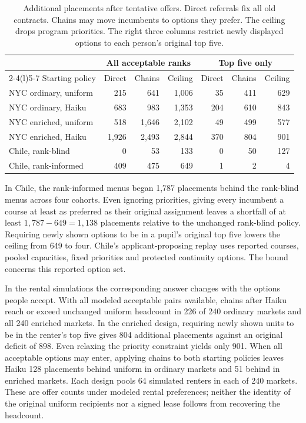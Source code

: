 \begin{table}[ht]\centering\small
\caption{Additional placements after tentative offers. Direct referrals fix all old contracts. Chains may move incumbents to options they prefer. The ceiling drops program priorities. The right three columns restrict newly displayed options to each person's original top five.}\label{tab:chain-flow}
\begin{tabular}{@{}l rrr rrr@{}}\toprule
 & \multicolumn{3}{c}{All acceptable ranks} & \multicolumn{3}{c}{Top five only}\\
\cmidrule(lr){2-4}\cmidrule(l){5-7}
Starting policy & Direct & Chains & Ceiling & Direct & Chains & Ceiling\\\midrule
NYC ordinary, uniform &215 &641 &1,006 &35 &411 &629\\
NYC ordinary, Haiku &683 &983 &1,353 &204 &610 &843\\
NYC enriched, uniform &518 &1,646 &2,102 &49 &499 &577\\
NYC enriched, Haiku &1,926 &2,493 &2,844 &370 &804 &901\\
Chile, rank-blind &0 &53 &133 &0 &50 &127\\
Chile, rank-informed &409 &475 &649 &1 &2 &4\\\bottomrule
\end{tabular}
\end{table}

In Chile, the rank-informed menus began 1,787 placements behind the rank-blind menus across four cohorts. Even ignoring priorities, giving every incumbent a course at least as preferred as their original assignment leaves a shortfall of at least $1,787-649=1,138$ placements relative to the unchanged rank-blind policy. Requiring newly shown options to be in a pupil's original top five lowers the ceiling from 649 to four. Chile's applicant-proposing replay uses reported courses, pooled capacities, fixed priorities and protected continuity options. The bound concerns this reported option set.

In the rental simulations the corresponding answer changes with the options people accept. With all modeled acceptable pairs available, chains after Haiku reach or exceed unchanged uniform headcount in 226 of 240 ordinary markets and all 240 enriched markets. In the enriched design, requiring newly shown units to be in the renter's top five gives 804 additional placements against an original deficit of 898. Even relaxing the priority constraint yields only 901. When all acceptable options may enter, applying chains to both starting policies leaves Haiku 128 placements behind uniform in ordinary markets and 51 behind in enriched markets. Each design pools 64 simulated renters in each of 240 markets. These are offer counts under modeled rental preferences; neither the identity of the original uniform recipients nor a signed lease follows from recovering the headcount.

